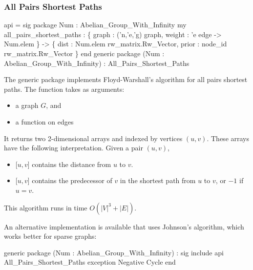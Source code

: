 \subsubsection{All Pairs Shortest Paths}
\begin{SML}
 api  = sig 
   package Num : Abelian_Group_With_Infinity
   my all_pairs_shortest_paths :
                 \{ graph : ('n,'e,'g) graph,
                   weight : 'e edge -> Num.elem
                 \} ->
                 \{ dist : Num.elem rw_matrix.Rw_Vector,
                   prior :  node_id rw_matrix.Rw_Vector
                 \}
 end
 generic package (Num : Abelian_Group_With_Infinity) 
    : All_Pairs_Shortest_Paths
\end{SML}
The generic package  implements Floyd-Warshall's algorithm
for all pairs shortest paths.  The function 
 takes as arguments: 
\begin{itemize}
\item a graph $G$, and
\item a  function on edges
\end{itemize}
It returns two 2-dimensional arrays  and 
indexed by vertices $(u,v)$.  These arrays have the following
interpretation.  Given a pair $(u,v)$,
\begin{itemize}
\item {}[$u,v$] contains the distance from $u$ to $v$.
\item {}[$u,v$] contains the predecessor of $v$ in the shortest
path from $u$ to $v$, or $-1$ if $u=v$.
\end{itemize}
This algorithm runs in time $O(|V|^3+|E|)$.

An alternative implementation is available that uses Johnson's algorithm, 
which works better for sparse graphs:
\begin{SML}
 generic package (Num : Abelian_Group_With_Infinity) 
    : sig include api All_Pairs_Shortest_Paths
          exception Negative Cycle
      end
\end{SML}

